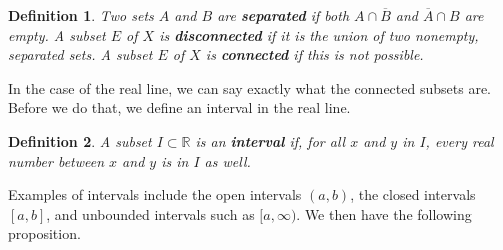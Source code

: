 \documentclass[12pt]{amsart}         %
\newtheorem{definition}{Definition}[section]
\theoremstyle{remark}
\newcommand{\R}{\mathbb{R}}
\begin{document}
\begin{definition}
Two sets $A$ and $B$ are \textbf{separated} if both $A \cap \overline{B}$ and $\overline{A}\cap B$ are empty. A subset $E$ of $X$ is \textbf{disconnected} if it is the union of two nonempty, separated sets. A subset $E$ of $X$ is \textbf{connected} if this is not possible.
\end{definition}

In the case of the real line, we can say exactly what the connected subsets are. Before we do that, we define an interval in the real line.

\begin{definition}
A subset $I \subset \R$ is an \textbf{interval} if, for all $x$ and $y$ in $I$, every real number between $x$ and $y$ is in $I$ as well.
\end{definition}

Examples of intervals include the open intervals $(a,b)$, the closed intervals $[a,b]$, and unbounded intervals such as $[a, \infty)$. We then have the following proposition.
\end{document}
